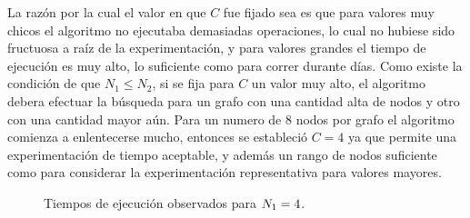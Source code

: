 La razón por la cual el valor en que $C$ fue fijado sea \valorFijo es que para
valores muy chicos el algoritmo no ejecutaba demasiadas operaciones, lo cual
no hubiese sido fructuosa a raíz de la experimentación, y para valores grandes
el tiempo de ejecución es muy alto, lo suficiente como para correr durante
días. Como existe la condición de que $N_1 \leq N_2$, si se fija para $C$ un
valor muy alto, el algoritmo debera efectuar la búsqueda para un grafo con una
cantidad alta de nodos y otro con una cantidad mayor aún. Para un numero de 8
nodos por grafo el algoritmo comienza a enlentecerse mucho, entonces
se estableció $C = 4$ ya que permite una experimentación de tiempo aceptable,
y además un rango de nodos suficiente como para considerar la experimentación
representativa para valores mayores.

\begin{figure}[H]
    \caption{Tiempos de ejecución observados para $N_1 = 4$.}
    \label{fig:exp2:n_1_eq_fijo}
    \centering
\end{figure}


